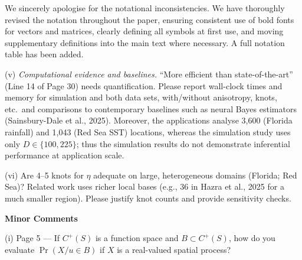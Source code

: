 \documentclass[12pt
]{article}
\begin{document}
\begin{Res}
We sincerely apologise for the notational inconsistencies. We have thoroughly revised the notation throughout the paper, ensuring consistent use of bold fonts for vectors and matrices, clearly defining all symbols at first use, and moving supplementary definitions into the main text where necessary. A full notation table has been added.
\end{Res}

\begin{Comments}
(v) \emph{Computational evidence and baselines.} ``More efficient than state-of-the-art'' (Line 14 of Page 30) needs quantification. Please report wall-clock times and memory for simulation and both data sets, with/without anisotropy, knots, etc.\ and comparisons to contemporary baselines such as neural Bayes estimators (Sainsbury-Dale et al., 2025). Moreover, the applications analyse 3,600 (Florida rainfall) and 1,043 (Red Sea SST) locations, whereas the simulation study uses only $D\in\{100,225\}$; thus the simulation results do not demonstrate inferential performance at application scale.
\end{Comments}

\begin{Res}

\end{Res}

\begin{Comments}
(vi) Are 4--5 knots for $\eta$ adequate on large, heterogeneous domains (Florida; Red Sea)? Related work uses richer local bases (e.g., 36 in Hazra et al., 2025 for a much smaller region). Please justify knot counts and provide sensitivity checks.
\end{Comments}

\begin{Res}
\end{Res}

\medskip
\noindent\textbf{Minor Comments}

\medskip

\begin{Comments}
(i) Page 5 --- If $C^+(S)$ is a function space and $B\subset C^+(S)$, how do you evaluate $\Pr(X/u\in B)$ if $X$ is a real-valued spatial process?
\end{Comments}
\end{document}
